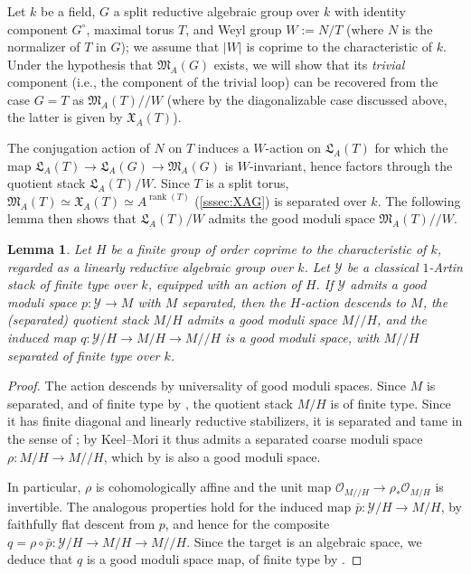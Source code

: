 \documentclass[12pt, oneside]{amsart}
\numberwithin{equation}{section}
\newtheorem{lemma}[subsubsection]{Lemma}
\theoremstyle{remark}
\theoremstyle{plain}
\newcommand{\frM}{\mathfrak{M}}
\newcommand{\frL}{\mathfrak{L}}
\newcommand{\frX}{\mathfrak{X}}
\newcommand{\OO}{\mathcal{O}}
\newcommand{\YY}{\mathcal{Y}}
\newcommand{\modmod}{/\!\!/}
\begin{document}
\subsubsection{}

Let $k$ be a field, $G$ a split reductive algebraic group over $k$ with identity component $G^\circ$, maximal torus $T$, and Weyl group $W := N/T$ (where $N$ is the normalizer of $T$ in $G$); we assume that $|W|$ is coprime to the characteristic of $k$.
Under the hypothesis that $\frM_A(G)$ exists, we will show that its \emph{trivial} component (i.e., the component of the trivial loop) can be recovered from the case $G=T$ as $\frM_A(T)\modmod W$ (where by the diagonalizable case discussed above, the latter is given by $\frX_A(T)$).

The conjugation action of $N$ on $T$ induces a $W$-action on $\frL_A(T)$ for which the map $\frL_A(T) \to \frL_A(G) \to \frM_A(G)$ is $W$-invariant, hence factors through the quotient stack $\frL_A(T)/W$.
Since $T$ is a split torus, $\frM_A(T) \simeq \frX_A(T) \simeq A^{\operatorname{rank}(T)}$ (\ref{sssec:XAG}) is separated over $k$.
The following lemma then shows that $\frL_A(T)/W$ admits the good moduli space $\frM_A(T)\modmod W$.

\begin{lemma}\label{lem:gms descent}
  Let $H$ be a finite group of order coprime to the characteristic of $k$, regarded as a linearly reductive algebraic group over $k$.
  Let $\YY$ be a classical $1$-Artin stack of finite type over $k$, equipped with an action of $H$.
  If $\YY$ admits a good moduli space $p : \YY \to M$ with $M$ separated, then the $H$-action descends to $M$, the (separated) quotient stack $M/H$ admits a good moduli space $M \modmod H$, and the induced map $q : \YY/H \to M/H \to M \modmod H$ is a good moduli space, with $M \modmod H$ separated of finite type over $k$.
\end{lemma}
\begin{proof}
  The action descends by universality of good moduli spaces.
  Since $M$ is separated, and of finite type by \cite[Thm.~4.16(xi)]{Alper}, the quotient stack $M/H$ is of finite type.
  Since it has finite diagonal and linearly reductive stabilizers, it is separated and tame in the sense of \cite[Thm.~3.2]{AOV}; by Keel--Mori it thus admits a separated coarse moduli space $\rho : M/H \to M \modmod H$, which by \cite[Rem.~4.2, Ex.~8.1]{Alper} is also a good moduli space.

  In particular, $\rho$ is cohomologically affine and the unit map $\OO_{M \modmod H}\to \rho_*\OO_{M/H}$ is invertible.
  The analogous properties hold for the induced map $\bar{p} : \YY/H \to M/H$, by faithfully flat descent from $p$, and hence for the composite $q = \rho \circ \bar{p} : \YY/H \to M/H \to M\modmod H$.
  Since the target is an algebraic space, we deduce that $q$ is a good moduli space map, of finite type by \cite[Thm.~4.16(xi)]{Alper}.
\end{proof}
\end{document}
